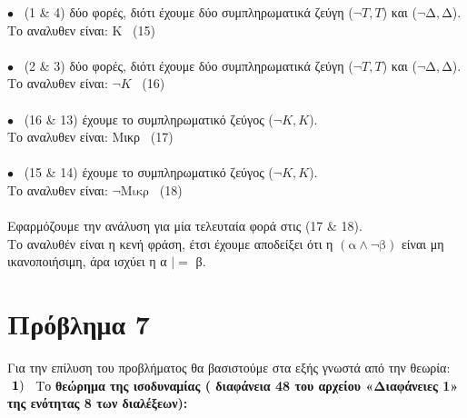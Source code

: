 \documentclass[10pt]{article}
\begin{document}
$\bullet$ \ (1 \&  4) δύο φορές,  διότι έχουμε δύο συμπληρωματικά ζεύγη ($\neg T, T$) και ($\neg \text{Δ}, \text{Δ}$). \\

\hspace{5mm}Το αναλυθεν είναι: Κ \ (15)  \\ \\ 

$\bullet$ \ (2 \&  3) δύο φορές,  διότι έχουμε δύο συμπληρωματικά ζεύγη ($\neg T, T$) και ($\neg \text{Δ}, \text{Δ}$). \\

\hspace{5mm}Το αναλυθεν είναι: $\neg K$ \ (16) \\ \\

$\bullet$ \ (16 \&  13) έχουμε το συμπληρωματικό ζεύγος ($\neg K, K$). \\

\hspace{5mm}Το αναλυθεν είναι: Μικρ \ (17) \\ \\

$\bullet$ \ (15 \&  14) έχουμε το συμπληρωματικό ζεύγος ($\neg K, K$). \\

\hspace{5mm}Το αναλυθεν είναι: $\neg \text{Μικρ}$ \ (18) \\ \\ 

Εφαρμόζουμε την ανάλυση για μία τελευταία φορά στις  (17 \&  18). \\

\hspace{5mm}Το αναλυθέν είναι η κενή φράση, έτσι έχουμε αποδείξει ότι η $( \text{α} \wedge \neg \text{β} ) $ είναι μη ικανοποιήσιμη, άρα ισχύει  η α $|=$ β.


\vspace{5mm}

\section*{Πρόβλημα 7}

\vspace{5mm}

Για την επίλυση του προβλήματος θα βασιστούμε στα εξής γνωστά από την θεωρία: \\

\hspace{5mm} $\bf \ 1) \normalfont$ \ Το \bf θεώρημα της ισοδυναμίας \normalfont ( διαφάνεια 48 του αρχείου «Διαφάνειες 1» της ενότητας 8 των διαλέξεων):
\end{document}
